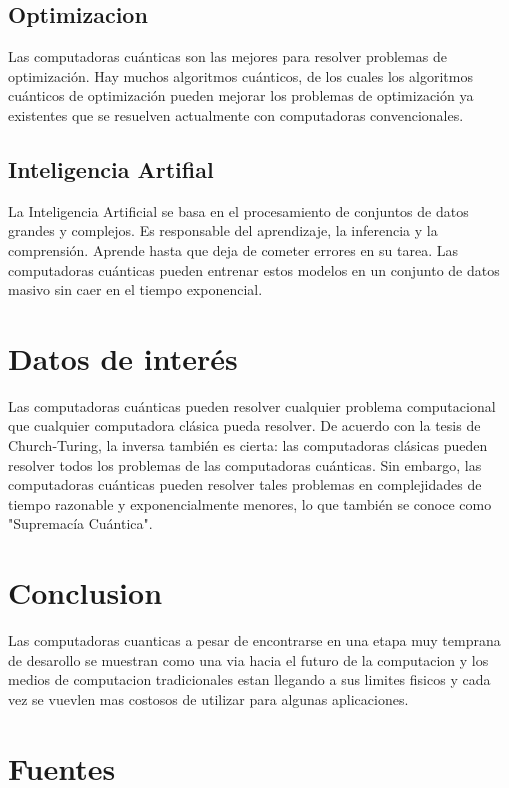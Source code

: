 \documentclass[11pt]{article}
\begin{document}
\subsection{Optimizacion}
\label{sec:org8f6badc}
\autocite{Marella_Parisa_2020} Las computadoras cuánticas son las mejores para resolver problemas de optimización. Hay muchos algoritmos cuánticos, de los cuales los algoritmos cuánticos de optimización pueden mejorar los problemas de optimización ya existentes que se resuelven actualmente con computadoras convencionales. 

\subsection{Inteligencia Artifial}
\label{sec:orgc6d7d92}
\autocite{Marella_Parisa_2020} La Inteligencia Artificial se basa en el procesamiento de conjuntos de datos grandes y complejos. Es responsable del aprendizaje, la inferencia y la comprensión. Aprende hasta que deja de cometer errores en su tarea. Las computadoras cuánticas pueden entrenar estos modelos en un conjunto de datos masivo sin caer en el tiempo exponencial.

\section{Datos de interés}
\label{sec:orgc5868d0}
\autocite{Arute_2019} Las computadoras cuánticas pueden resolver cualquier problema computacional que cualquier computadora clásica pueda resolver. De acuerdo con la tesis de Church-Turing, la inversa también es cierta: las computadoras clásicas pueden resolver todos los problemas de las computadoras cuánticas. Sin embargo, las computadoras cuánticas pueden resolver tales problemas en complejidades de tiempo razonable y exponencialmente menores, lo que también se conoce como "Supremacía Cuántica".

\section{Conclusion}
\label{sec:orgb3e5b06}
Las computadoras cuanticas a pesar de encontrarse en una etapa muy temprana de desarollo se muestran como una via hacia el futuro de la computacion y los medios de computacion tradicionales estan llegando a sus limites fisicos y cada vez se vuevlen mas costosos de utilizar para algunas aplicaciones.

\section{Fuentes}
\label{sec:org376ac05}
\printbibliography[heading=none]
\end{document}
